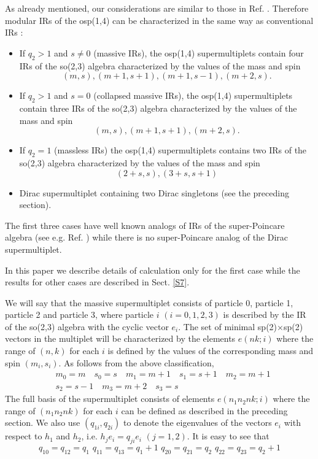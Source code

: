\documentclass[a4paper,12pt]{article}%
\begin{document}
As already mentioned, our considerations are similar to those
in Ref. \cite{Heidenreich}. Therefore modular IRs of the 
osp(1,4) can be characterized in the same way as 
conventional IRs \cite{Heidenreich}:

\begin{itemize}

\item If $q_2>1$ and $s\neq 0$ (massive IRs), the osp(1,4)
supermultiplets contain four IRs of the so(2,3) algebra
characterized by the values of the mass and spin 
$$(m,s),(m+1,s+1),(m+1,s-1),(m+2,s).$$

\item If $q_2>1$ and $s=0$ (collapsed massive IRs), the osp(1,4)
supermultiplets contain three IRs of the so(2,3) algebra
characterized by the values of the mass and spin 
$$(m,s),(m+1,s+1),(m+2,s).$$

\item If $q_2=1$ (massless IRs) the osp(1,4)
supermultiplets contains two IRs of the so(2,3) algebra
characterized by the values of the mass and spin 
$$(2+s,s),(3+s,s+1)$$

\item Dirac supermultiplet containing two Dirac
singletons (see the preceding section).   
\end{itemize}

The first three cases have well known analogs of IRs of the 
super-Poincare algebra (see e.g. Ref. \cite{Wein-super}) while
there is no super-Poincare analog of the Dirac supermultiplet.

In this paper we describe details of calculation only for the
first case while the results for other cases are described in 
Sect. \ref{S7}.

We will say that the massive supermultiplet consists of particle 0,
particle 1, particle 2 and particle 3, where particle $i$ $(i=0,1,2,3)$
is described by the IR of the so(2,3) algebra with the cyclic vector
$e_i$. The set of minimal sp(2)$\times$sp(2) vectors in the multiplet
will be characterized by the elements $e(nk;i)$ where the range of $(n,k)$
for each $i$ is defined by the values of the corresponding mass and spin
$(m_i,s_i)$. As follows from the above classification, 
\begin{eqnarray}
&m_0=m\quad s_0=s\quad m_1=m+1\quad s_1=s+1\quad m_2=m+1\nonumber\\
&s_2=s-1\quad m_3=m+2\quad s_3=s
\label{37}
\end{eqnarray}
The full basis of the supermultiplet consists of 
elements $e(n_1n_2nk;i)$ 
where the range of $(n_1n_2nk)$ for each $i$ can be 
defined as described
in the preceding section. We also use $(q_{1i},q_{2i})$ to denote the
eigenvalues of the vectors $e_i$ with respect to $h_1$ and $h_2$, i.e.
$h_je_i=q_{ji}e_i$ $(j=1,2)$. It is easy to see that 
\begin{equation}
q_{10}=q_{12}=q_1\,\, q_{11}=q_{13}=q_1+1 \,\, q_{20}=q_{21}=q_2
\,\, q_{22}=q_{23}=q_2+1
\label{38}
\end{equation}
 
\end{document}
